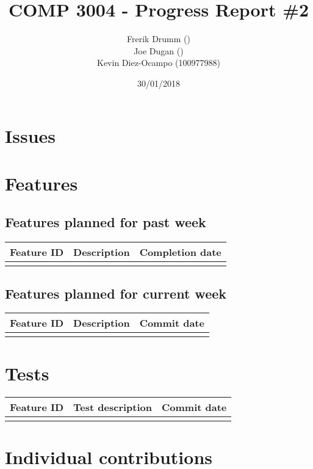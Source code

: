 \documentclass[10pt,a4paper]{article}
\title{COMP 3004 - Progress Report \#2}
\author{Frerik Drumm ()\\Joe Dugan ()\\Kevin Diez-Ocampo (100977988)}
\date{30/01/2018}
\begin{document}
\maketitle


\section{Issues}

\section{Features}

\subsection{Features planned for past week}

\begin{center}
\begin{tabular}{l l l}
Feature ID & Description & Completion date\\
\hline\\
\end{tabular}
\end{center}


\subsection{Features planned for current week}

\begin{center}
\begin{tabular}{l l l}
Feature ID & Description & Commit date\\
\hline\\
\end{tabular}
\end{center}

\section{Tests}

\begin{center}
\begin{tabular}{l l l}
Feature ID & Test description & Commit date\\
\hline\\
\end{tabular}
\end{center}

\section{Individual contributions}
\end{document}
